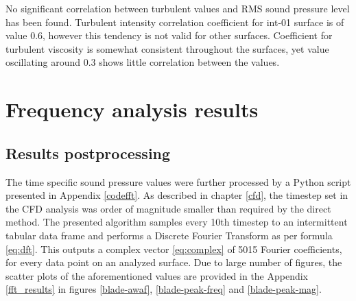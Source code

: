 No significant correlation between turbulent values and RMS sound pressure level has been found. Turbulent intensity correlation coefficient for int-01 surface is of value 0.6, however this tendency is not valid for other surfaces. Coefficient for turbulent viscosity is somewhat consistent throughout the surfaces, yet value oscillating around 0.3 shows little correlation between the values.


\section{Frequency analysis results} \label{fft}

\subsection{Results postprocessing} \label{fft_res_prep}
The time specific sound pressure values were further processed by a Python script presented in Appendix \ref{codefft}. As described in chapter \ref{cfd}, the timestep set in the CFD analysis was order of magnitude smaller than required by the direct method. The presented algorithm samples every 10th timestep to an intermittent tabular data frame and performs a Discrete Fourier Transform as per formula \ref{eq:dft}. This outputs a complex vector \ref{eq:complex} of 5015 Fourier coefficients, for every data point on an analyzed surface. Due to large number of figures, the scatter plots of the aforementioned values are provided in the Appendix \ref{fft_results} in figures \ref{blade-awaf}, \ref{blade-peak-freq} and \ref{blade-peak-mag}.


